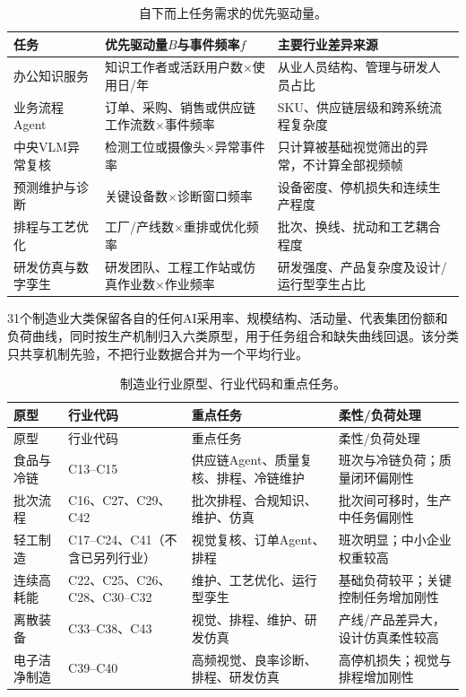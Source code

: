 \documentclass[preprint]{elsarticle}
\begin{document}
\begin{table}[htbp]
 \centering
 \caption{自下而上任务需求的优先驱动量。}
 \label{tab:task-drivers}
 \begin{tabularx}{\textwidth}{p{3.0cm}X p{5.1cm}}
  \toprule
  任务 & 优先驱动量$B$与事件频率$f$ & 主要行业差异来源 \\
  \midrule
  办公知识服务 & 知识工作者或活跃用户数$\times$使用日/年 & 从业人员结构、管理与研发人员占比 \\
  业务流程Agent & 订单、采购、销售或供应链工作流数$\times$事件频率 & SKU、供应链层级和跨系统流程复杂度 \\
  中央VLM异常复核 & 检测工位或摄像头$\times$异常事件率 & 只计算被基础视觉筛出的异常，不计算全部视频帧 \\
  预测维护与诊断 & 关键设备数$\times$诊断窗口频率 & 设备密度、停机损失和连续生产程度 \\
  排程与工艺优化 & 工厂/产线数$\times$重排或优化频率 & 批次、换线、扰动和工艺耦合程度 \\
  研发仿真与数字孪生 & 研发团队、工程工作站或仿真作业数$\times$作业频率 & 研发强度、产品复杂度及设计/运行型孪生占比 \\
  \bottomrule
 \end{tabularx}
\end{table}

31个制造业大类保留各自的任何AI采用率、规模结构、活动量、代表集团份额和负荷曲线，同时按生产机制归入六类原型，用于任务组合和缺失曲线回退。该分类只共享机制先验，不把行业数据合并为一个平均行业。

\begin{longtable}{p{3.4cm}p{4.0cm}p{4.3cm}p{3.0cm}}
 \caption{制造业行业原型、行业代码和重点任务。}\label{tab:industry-archetypes}\\
 \toprule
 原型 & 行业代码 & 重点任务 & 柔性/负荷处理 \\
 \midrule
 \endfirsthead
 \toprule
 原型 & 行业代码 & 重点任务 & 柔性/负荷处理 \\
 \midrule
 \endhead
 食品与冷链 & C13--C15 & 供应链Agent、质量复核、排程、冷链维护 & 班次与冷链负荷；质量闭环偏刚性 \\
 批次流程 & C16、C27、C29、C42 & 批次排程、合规知识、维护、仿真 & 批次间可移时，生产中任务偏刚性 \\
 轻工制造 & C17--C24、C41（不含已另列行业） & 视觉复核、订单Agent、排程 & 班次明显；中小企业权重较高 \\
 连续高耗能 & C22、C25、C26、C28、C30--C32 & 维护、工艺优化、运行型孪生 & 基础负荷较平；关键控制任务增加刚性 \\
 离散装备 & C33--C38、C43 & 视觉、排程、维护、研发仿真 & 产线/产品差异大，设计仿真柔性较高 \\
 电子洁净制造 & C39--C40 & 高频视觉、良率诊断、排程、研发仿真 & 高停机损失；视觉与排程增加刚性 \\
 \bottomrule
\end{longtable}
\end{document}
